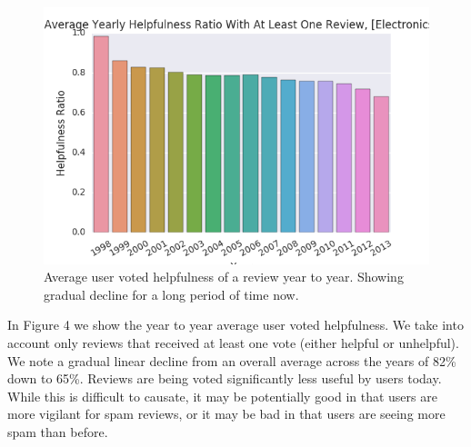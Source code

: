 \documentclass[journal, a4paper]{IEEEtran}
\begin{document}
\begin{figure}[!hbt]
    \begin{center}
    \includegraphics[width=\columnwidth]{helpfulness.png}
    \caption{Average user voted helpfulness of a review year to year. Showing gradual decline for a long period of time now.}
    \end{center}
\end{figure}

In Figure 4 we show the year to year average user voted helpfulness. We take into account only reviews that received at least one vote (either helpful or unhelpful). We note a gradual linear decline from an overall average across the years of 82\% down to 65\%. Reviews are being voted significantly less useful by users today. While this is difficult to causate, it may be potentially good in that users are more vigilant for spam reviews, or it may be bad in that users are seeing more spam than before.
\end{document}
